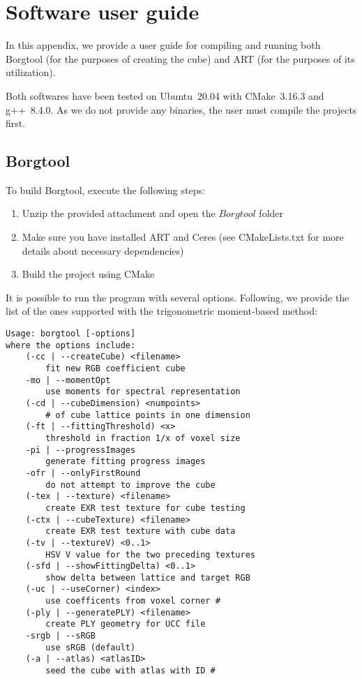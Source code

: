 \chapter{Software user guide}

In this appendix, we provide a user guide for compiling and running both Borgtool (for the purposes of creating the cube) and ART (for the purposes of its utilization).

Both softwares have been tested on Ubuntu~20.04 with CMake~3.16.3 and g++~8.4.0. As we do not provide any binaries, the user must compile the projects first.

\section{Borgtool}

To build Borgtool, execute the following steps:
\begin{enumerate}
	\item Unzip the provided attachment and open the $Borgtool$ folder 
	\item Make sure you have installed ART and Ceres (see CMakeLists.txt for more details about necessary dependencies)
	\item Build the project using CMake
\end{enumerate}

It is possible to run the program with several options. Following, we provide the list of the ones supported with the trigonometric moment-based method:

\begin{verbatim}
Usage: borgtool [-options]
where the options include:
    (-cc | --createCube) <filename>
        fit new RGB coefficient cube
    -mo | --momentOpt 
        use moments for spectral representation
    (-cd | --cubeDimension) <numpoints>
        # of cube lattice points in one dimension
    (-ft | --fittingThreshold) <x>
        threshold in fraction 1/x of voxel size
    -pi | --progressImages
        generate fitting progress images
    -ofr | --onlyFirstRound
        do not attempt to improve the cube
    (-tex | --texture) <filename>
        create EXR test texture for cube testing
    (-ctx | --cubeTexture) <filename>
        create EXR test texture with cube data
    (-tv | --textureV) <0..1>
        HSV V value for the two preceding textures
    (-sfd | --showFittingDelta) <0..1>
        show delta between lattice and target RGB
    (-uc | --useCorner) <index>
        use coefficents from voxel corner #
    (-ply | --generatePLY) <filename>
        create PLY geometry for UCC file
    -srgb | --sRGB 
        use sRGB (default)
    (-a | --atlas) <atlasID>
        seed the cube with atlas with ID #
\end{verbatim}


